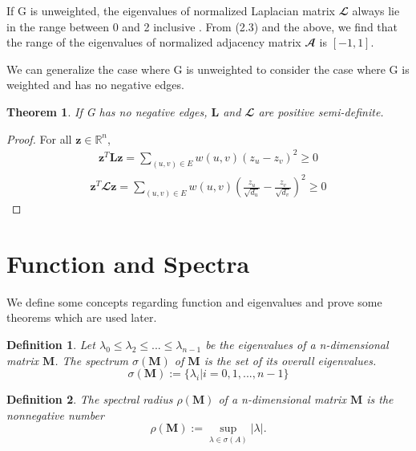 \documentclass[senior,final,11pt]{iscs-thesis}
\newtheorem{theorem}{Theorem}
\newtheorem{definition}{Definition}
\begin{document}
If G is unweighted, the eigenvalues of normalized Laplacian matrix $\mathbfcal{L}$ always lie in the range between 0 and 2 inclusive \cite{chung1997spectral}. From (2.3) and the above, we find that the range of the eigenvalues of normalized adjacency matrix ${\mathbfcal A}$ is $[-1,1]$.

We can generalize the case where G is unweighted to consider the case where G is weighted and has no negative edges.
\begin{theorem}
    If G has no negative edges, $\mathbf{L}$ and $\mathbfcal{L}$ are positive semi-definite.
\end{theorem}
\begin{proof}
    For all $\mathbf{z} \in \mathbb{R}^n$,
    \begin{align*}
        \mathbf{z}^T \mathbf{L} \mathbf{z} = \sum_{(u,v) \in E} w(u,v)(z_u - z_v)^2 \geq 0
    \end{align*}
    \begin{align*}
        \mathbf{z}^T \mathbfcal{L} \mathbf{z} = \sum_{(u,v) \in E} w(u,v)\left(\frac{z_u}{\sqrt{d_u}} - \frac{z_v}{\sqrt{d_v}}\right)^2 \geq 0
    \end{align*}
\end{proof}

\section{Function and Spectra}
We define some concepts regarding function and eigenvalues and prove some theorems which are used later.
\begin{definition}
    Let $\lambda_0 \leq \lambda_2 \leq ... \leq \lambda_{n-1}$ be the eigenvalues of a n-dimensional matrix $\mathbf{M}$. The spectrum $\sigma(\mathbf{M})$ of $\mathbf{M}$ is the set of its overall eigenvalues.
    \[\sigma(\mathbf{M}) := \{\lambda_i | i=0,1,...,n-1\}\]
\end{definition}
\begin{definition}
    The spectral radius $\rho(\mathbf{M})$ of a n-dimensional matrix $\mathbf{M}$ is the nonnegative number
    \[\rho(\mathbf{M}):=\sup_{\lambda \in \sigma(A)} |\lambda|.\]
\end{definition}
\end{document}
